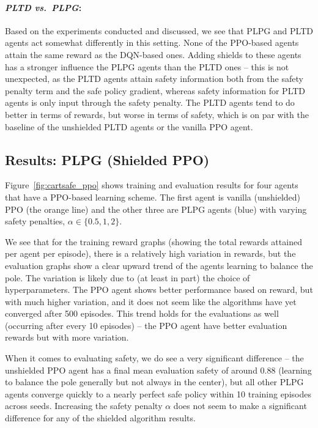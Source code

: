 \paragraph{\textit{PLTD vs.\ PLPG}:}
Based on the experiments conducted and discussed, we see that PLPG and PLTD agents act somewhat differently in this setting. None of the PPO-based agents attain the same reward as the DQN-based ones. Adding shields to these agents has a stronger influence the PLPG agents than the PLTD ones -- this is not unexpected, as the PLTD agents attain safety information both from the safety penalty term and the safe policy gradient, whereas safety information for PLTD agents is only input through the safety penalty. The PLTD agents tend to do better in terms of rewards, but worse in terms of safety, which is on par with the baseline of the unshielded PLTD agents or the vanilla PPO agent.


\subsection{Results: PLPG (Shielded PPO)}
Figure~\ref{fig:cartsafe_ppo} shows training and evaluation results for four agents that have a PPO-based learning scheme. The first agent is vanilla (unshielded) PPO (the orange line) and the other three are PLPG agents (blue) with varying safety penalties, $\alpha\in\{0.5,1,2\}$.

We see that for the training reward graphs (showing the total rewards attained per agent per episode), there is a relatively high variation in rewards, but the evaluation graphs show a clear upward trend of the agents learning to balance the pole. The variation is likely due to (at least in part) the choice of hyperparameters. The PPO agent shows better performance based on reward, but with much higher variation, and it does not seem like the algorithms have yet converged after 500 episodes. This trend holds for the evaluations as well (occurring after every 10 episodes) -- the PPO agent have better evaluation rewards but with more variation. 

When it comes to evaluating safety, we do see a very significant difference -- the unshielded PPO agent has a final mean evaluation safety of around 0.88 (learning to balance the pole generally but not always in the center), but all other PLPG agents converge quickly to a nearly perfect safe policy within 10 training episodes across seeds. Increasing the safety penalty $\alpha$ does not seem to make a significant difference for any of the shielded algorithm results.


